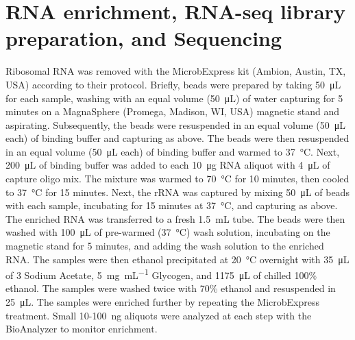 \section{RNA enrichment, RNA-seq library preparation, and Sequencing}
Ribosomal RNA was removed with the MicrobExpress kit (Ambion, Austin, TX, USA) according to their protocol. Briefly, beads were prepared by taking \SI{50}{\micro\liter} for each sample, washing with an equal volume (\SI{50}{\micro\liter}) of water capturing for 5 minutes on a MagnaSphere (Promega, Madison, WI, USA) magnetic stand and aspirating. Subsequently, the beads were resuspended in an equal volume (\SI{50}{\micro\liter} each) of binding buffer and capturing as above. The beads were then resuspended in an equal volume (\SI{50}{\micro\liter} each) of binding buffer and warmed to \SI{37}{\degreeCelsius}. Next, \SI{200}{\micro\liter} of binding buffer was added to each \SI{10}{\micro\gram} RNA aliquot with \SI{4}{\micro\liter} of capture oligo mix. The mixture was warmed to \SI{70}{\degreeCelsius} for 10 minutes, then cooled to \SI{37}{\degreeCelsius} for 15 minutes. Next, the rRNA was captured by mixing \SI{50}{\micro\liter} of beads with each sample, incubating for 15 minutes at \SI{37}{\degreeCelsius}, and capturing as above. The enriched RNA was transferred to a fresh \SI{1.5}{\milli\liter} tube. The beads were then washed with \SI{100}{\micro\liter} of pre-warmed (\SI{37}{\degreeCelsius}) wash solution, incubating on the magnetic stand for 5 minutes, and adding the wash solution to the enriched RNA. The samples were then ethanol precipitated at \SI{20}{\degreeCelsius} overnight with \SI{35}{\micro\liter} of \SI{3}{\Molar} Sodium Acetate, \SI{5}{\milli\gram\per\milli\liter} Glycogen, and \SI{1175}{\micro\liter} of chilled 100\% ethanol. The samples were washed twice with 70\% ethanol and resuspended in \SI{25}{\micro\liter}. The samples were enriched further by repeating the MicrobExpress treatment. Small 10-\SI{100}{\nano\gram} aliquots were analyzed at each step with the BioAnalyzer to monitor enrichment.


